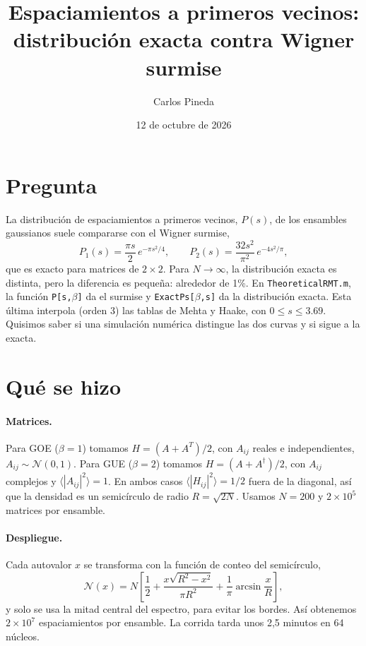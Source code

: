 \documentclass[10pt]{article}
\title{Espaciamientos a primeros vecinos:\\ distribución exacta contra Wigner surmise}
\author{Carlos Pineda}
\date{12 de octubre de 2026}\vspace{-1em}
\begin{document}
\maketitle

\section{Pregunta}

La distribución de espaciamientos a primeros vecinos, $P(s)$, de los ensambles
gaussianos suele compararse con el Wigner surmise,
\begin{equation}
  P_1(s) = \frac{\pi s}{2}\, e^{-\pi s^2/4}, \qquad
  P_2(s) = \frac{32 s^2}{\pi^2}\, e^{-4 s^2/\pi},
\end{equation}
que es exacto para matrices de $2\times2$. Para $N\to\infty$, la distribución
exacta es distinta, pero la diferencia es pequeña: alrededor de 1\%. En
\texttt{TheoreticalRMT.m}, la función \texttt{P[s,$\beta$]} da el surmise y
\texttt{ExactPs[$\beta$,s]} da la distribución exacta. Esta última interpola
(orden 3) las tablas de Mehta y Haake, con $0\le s\le 3.69$. Quisimos saber si
una simulación numérica distingue las dos curvas y si sigue a la exacta.

\section{Qué se hizo}

\paragraph{Matrices.} Para GOE ($\beta=1$) tomamos $H=(A+A^T)/2$, con
$A_{ij}$ reales e independientes, $A_{ij}\sim\mathcal N(0,1)$. Para GUE
($\beta=2$) tomamos $H=(A+A^\dagger)/2$, con $A_{ij}$ complejos y
$\langle|A_{ij}|^2\rangle=1$. En ambos casos
$\langle|H_{ij}|^2\rangle=1/2$ fuera de la diagonal, así que la densidad es un
semicírculo de radio $R=\sqrt{2N}$. Usamos $N=200$ y $2\times10^5$ matrices
por ensamble.

\paragraph{Despliegue.} Cada autovalor $x$ se transforma con la función de
conteo del semicírculo,
\begin{equation}
  \mathcal N(x) = N\left[\frac12 + \frac{x\sqrt{R^2-x^2}}{\pi R^2}
    + \frac1\pi \arcsin\frac{x}{R}\right],
\end{equation}
y solo se usa la mitad central del espectro, para evitar los bordes. Así
obtenemos $2\times10^7$ espaciamientos por ensamble. La corrida tarda unos
2,5 minutos en 64 núcleos.
\end{document}
